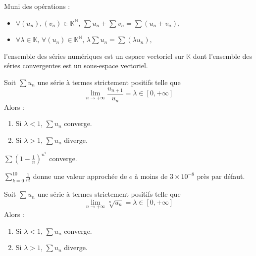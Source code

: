   \begin{proposition}
    Muni des opérations :
    \begin{itemize}
      \item $\forall (u_n), (v_n) \in \mathbb{K}^{\mathbb{N}}, \, \sum u_n + \sum v_n = \sum (u_n + v_n)$,
      \item $\forall \lambda \in \mathbb{K}, \, \forall (u_n) \in \mathbb{K}^{\mathbb{N}}, \, \lambda \sum u_n = \sum (\lambda u_n)$,
    \end{itemize}
    l'ensemble des séries numériques est un espace vectoriel sur $\mathbb{K}$ dont l'ensemble des séries convergentes est un sous-espace vectoriel.
  \end{proposition}


  \begin{proposition}
    Soit $\sum u_n$ une série à termes strictement positifs telle que
    \[ \lim_{n \rightarrow +\infty} \frac{u_{n+1}}{u_n} = \lambda \in [0, +\infty] \]
    Alors :
    \begin{enumerate}[label={\bfseries(\roman*)}]
      \item Si $\lambda < 1$, $\sum u_n$ converge.
      \item Si $\lambda > 1$, $\sum u_n$ diverge.
    \end{enumerate}
  \end{proposition}


  \begin{example}
    $\sum \left( 1 - \frac{1}{n} \right)^{n^2}$ converge.
  \end{example}


  \begin{example}
    $\sum_{k=0}^{10} \frac{1}{n!}$ donne une valeur approchée de $e$ à moins de $3 \times 10^{-8}$ près par défaut.
  \end{example}


  \begin{proposition}
    Soit $\sum u_n$ une série à termes strictement positifs telle que
    \[ \lim_{n \rightarrow +\infty} \sqrt[n]{u_n} = \lambda \in [0, +\infty] \]
    Alors :
    \begin{enumerate}[label={\bfseries(\roman*)}]
      \item Si $\lambda < 1$, $\sum u_n$ converge.
      \item Si $\lambda > 1$, $\sum u_n$ diverge.
    \end{enumerate}
  \end{proposition}

